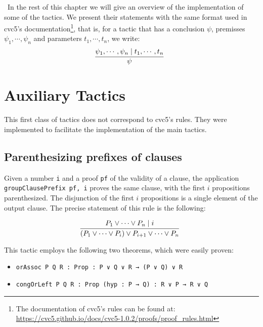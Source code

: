 \medskip~In the rest of this chapter we will give an overview of the implementation of some of the
tactics. We present their statements with the same format used in cvc5's
documentation\footnote{The documentation of cvc5's rules can be found at:
  \url{https://cvc5.github.io/docs/cvc5-1.0.2/proofs/proof_rules.html}}, that is,
for a tactic that has a conclusion $\psi$, premisses $\psi_{1}, \cdots, \psi_{n}$ and
parameters $t_{1}, \cdots, t_{n}$, we write:
\[
  \infer[]{\psi}{\psi_{1}, \cdots, \psi_{n} \mid t_{1}, \cdots, t_{n}}
\]

\section{Auxiliary Tactics}

This first class of tactics does not correspond to cvc5's rules. They were implemented
to facilitate the implementation of the main tactics.

\subsection{Parenthesizing prefixes of clauses}

Given a number \texttt{i} and a proof \texttt{pf}
of the validity of a clause, the application \texttt{groupClausePrefix pf, i} proves the same clause, with the
first $i$ propositions parenthesized. The disjunction of the first $i$ propositions is a single element of the output clause.  The precise statement of this rule
is the following:

\[
  \infer[]{(P_{1} \vee \cdots \vee P_{i}) \vee P_{i + 1} \vee \cdots \vee P_{n}}
    {P_{1} \vee \cdots \vee P_{n} \mid i}
\]

This tactic employs the following two theorems, which were easily proven:

\begin{itemize}
  \item \texttt{orAssoc {P Q R : Prop} : P ∨ Q ∨ R → (P ∨ Q) ∨ R}
  \item \texttt{congOrLeft {P Q R : Prop} (hyp : P → Q) : R ∨ P → R ∨ Q}
\end{itemize}


